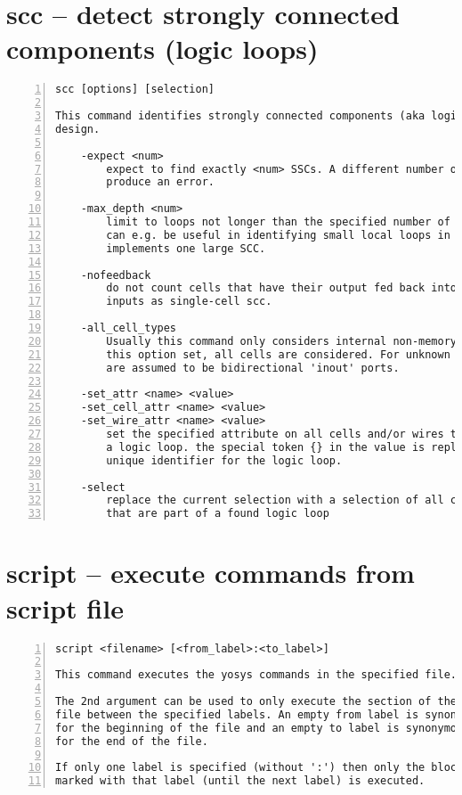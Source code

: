 \section{scc -- detect strongly connected components (logic loops)}
\label{cmd:scc}
\begin{lstlisting}[numbers=left,frame=single]
    scc [options] [selection]

This command identifies strongly connected components (aka logic loops) in the
design.

    -expect <num>
        expect to find exactly <num> SSCs. A different number of SSCs will
        produce an error.

    -max_depth <num>
        limit to loops not longer than the specified number of cells. This
        can e.g. be useful in identifying small local loops in a module that
        implements one large SCC.

    -nofeedback
        do not count cells that have their output fed back into one of their
        inputs as single-cell scc.

    -all_cell_types
        Usually this command only considers internal non-memory cells. With
        this option set, all cells are considered. For unknown cells all ports
        are assumed to be bidirectional 'inout' ports.

    -set_attr <name> <value>
    -set_cell_attr <name> <value>
    -set_wire_attr <name> <value>
        set the specified attribute on all cells and/or wires that are part of
        a logic loop. the special token {} in the value is replaced with a
        unique identifier for the logic loop.

    -select
        replace the current selection with a selection of all cells and wires
        that are part of a found logic loop
\end{lstlisting}

\section{script -- execute commands from script file}
\label{cmd:script}
\begin{lstlisting}[numbers=left,frame=single]
    script <filename> [<from_label>:<to_label>]

This command executes the yosys commands in the specified file.

The 2nd argument can be used to only execute the section of the
file between the specified labels. An empty from label is synonymous
for the beginning of the file and an empty to label is synonymous
for the end of the file.

If only one label is specified (without ':') then only the block
marked with that label (until the next label) is executed.
\end{lstlisting}

